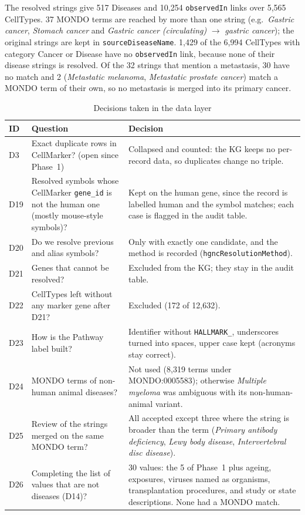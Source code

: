 The resolved strings give 517 Diseases and 10,254 \texttt{observedIn} links over 5,565 CellTypes. 37 MONDO terms are reached by more than one string (e.g.\ \emph{Gastric cancer}, \emph{Stomach cancer} and \emph{Gastric cancer (circulating)} $\rightarrow$ \emph{gastric cancer}); the original strings are kept in \texttt{sourceDiseaseName}. 1,429 of the 6,994 CellTypes with category Cancer or Disease have no \texttt{observedIn} link, because none of their disease strings is resolved. Of the 32 strings that mention a metastasis, 30 have no match and 2 (\emph{Metastatic melanoma}, \emph{Metastatic prostate cancer}) match a MONDO term of their own, so no metastasis is merged into its primary cancer.

\begin{table}[htbp]
\centering
\footnotesize
\begin{tabularx}{\linewidth}{|l|X|X|}
\hline
\textbf{ID} & \textbf{Question} & \textbf{Decision} \\ \hline
D3 & Exact duplicate rows in CellMarker? (open since Phase~1) & Collapsed and counted: the KG keeps no per-record data, so duplicates change no triple. \\ \hline
D19 & Resolved symbols whose CellMarker \texttt{gene\_id} is not the human one (mostly mouse-style symbols)? & Kept on the human gene, since the record is labelled human and the symbol matches; each case is flagged in the audit table. \\ \hline
D20 & Do we resolve previous and alias symbols? & Only with exactly one candidate, and the method is recorded (\texttt{hgncResolutionMethod}). \\ \hline
D21 & Genes that cannot be resolved? & Excluded from the KG; they stay in the audit table. \\ \hline
D22 & CellTypes left without any marker gene after D21? & Excluded (172 of 12,632). \\ \hline
D23 & How is the Pathway label built? & Identifier without \texttt{HALLMARK\_}, underscores turned into spaces, upper case kept (acronyms stay correct). \\ \hline
D24 & MONDO terms of non-human animal diseases? & Not used (8,319 terms under MONDO:0005583); otherwise \emph{Multiple myeloma} was ambiguous with its non-human-animal variant. \\ \hline
D25 & Review of the strings merged on the same MONDO term? & All accepted except three where the string is broader than the term (\emph{Primary antibody deficiency}, \emph{Lewy body disease}, \emph{Intervertebral disc disease}). \\ \hline
D26 & Completing the list of values that are not diseases (D14)? & 30 values: the 5 of Phase~1 plus ageing, exposures, viruses named as organisms, transplantation procedures, and study or state descriptions. None had a MONDO match. \\ \hline
\end{tabularx}
\caption{Decisions taken in the data layer}
\label{tab:data-decisions}
\end{table}

